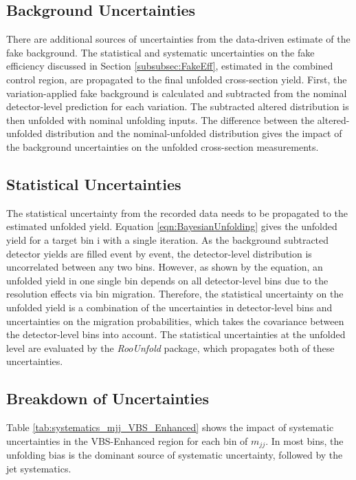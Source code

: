 \subsection{Background Uncertainties}
\label{subsec:BkgUnc}
There are additional sources of uncertainties from the data-driven estimate of the fake background. The statistical and systematic uncertainties on the fake efficiency discussed in Section \ref{subsubsec:FakeEff}, estimated in the combined control region, are propagated to the final unfolded cross-section yield. First, the variation-applied fake background is calculated and subtracted from the nominal detector-level prediction for each variation. The subtracted altered distribution is then unfolded with nominal unfolding inputs. The difference between the altered-unfolded distribution and the nominal-unfolded distribution gives the impact of the background uncertainties on the unfolded cross-section measurements.

\subsection{Statistical Uncertainties}
\label{subsubsec:StatUnc}
The statistical uncertainty from the recorded data needs to be propagated to the estimated unfolded yield. Equation \ref{eqn:BayesianUnfolding} gives the unfolded yield for a target bin i with a single iteration. As the background subtracted detector yields are filled event by event, the detector-level distribution is uncorrelated between any two bins. However, as shown by the equation, an unfolded yield in one single bin depends on all detector-level bins due to the resolution effects via bin migration. Therefore, the statistical uncertainty on the unfolded yield is a combination of the uncertainties in detector-level bins and uncertainties on the migration probabilities, which takes the covariance between the detector-level bins into account. The statistical uncertainties at the unfolded level are evaluated by the \textit{RooUnfold} package, which propagates both of these uncertainties.

\subsection{Breakdown of Uncertainties }
\label{subsec:SysUncBreakdown}
Table \ref{tab:systematics_mjj_VBS_Enhanced} shows the impact of systematic uncertainties in the VBS-Enhanced region for each bin of $m_{jj}$. In most bins, the unfolding bias is the dominant source of systematic uncertainty, followed by the jet systematics. 

